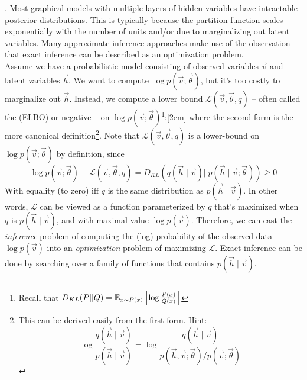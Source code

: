 \documentclass[11pt]{article}
\begin{document}
\newcommand\lpv{\log p(\vec{v}; \vec{\theta})}
\renewcommand\elbo{\mathcal{L}(\vec v, \vec{\theta}, q)}
\newcommand\Dkl[2]{D_{KL}\left( #1 ~||~ #2 \right)}

\p {}. Most graphical models with multiple layers of hidden variables have intractable posterior distributions. This is typically because the partition function scales exponentially with the number of units and/or due to marginalizing out latent variables. Many approximate inference approaches make use of the observation that exact inference can be described as an optimization problem. \\ 

Assume we have a probabilistic model consisting of observed variables $\vec{v}$ and latent variables $\vec{h}$. We want to compute $\log p(\vec v;\vec{\theta})$, but it's too costly to marginalize out $\vec{h}$. Instead, we compute a lower bound $\mathcal{L}(\vec v, \vec{\theta}, q)$ -- often called the  (ELBO) or negative  -- on $\log p(\vec v; \vec{\theta})$\footnote{Recall that $D_{KL}(P || Q) = \E[x \sim P(x)]{\log \frac{P(x)}{Q(x)} }$}:[2em]
\graybox{
	\elbo &= \lpv - \Dkl{ q(\vec{h} \mid \vec{v}) }{p(\vec{h} \mid \vec{v}; \vec{\theta})} \\
	&= - \E[\vec{h} \sim q(\vec h \mid \vec v)]{\log p(\vec h, \vec v)} + H(q(\vec h \mid \vec v))
}
where the second form is the more canonical definition\footnote{This can be derived easily from the first form. Hint: $$
	\log \frac{q(\vec h \mid \vec v)}{ p(\vec h \mid \vec v)} = 
	\log \frac{q(\vec h \mid \vec v)}{ p(\vec h, \vec v; \vec{\theta}) / p(\vec v; \vec{\theta})} 
$$}. Note that $\elbo$ is a lower-bound on $\lpv$ by definition, since 
$$\lpv - \elbo = D_{KL}\left(q(\vec{h} \mid \vec{v}) ||
p(\vec{h} \mid \vec{v}; \vec{\theta}) \right) \ge 0
$$
With equality (to zero) iff $q$ is the same distribution as $p(\vec h \mid \vec v)$. In other words, $\mathcal L$ can be viewed as a function parameterized by $q$ that's maximized when $q$ is $p(\vec h \mid \vec v)$, and with maximal value $\log p(\vec v)$. Therefore, we can cast the \textit{inference} problem of computing the (log) probability of the observed data  $\log p(\vec v)$ into an \textit{optimization} problem of maximizing $\mathcal L$. Exact inference can be done by searching over a family of functions that contains $p(\vec h \mid \vec v)$. 
\end{document}
